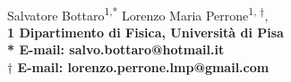 \documentclass[10pt,letterpaper]{article}
\date{15.03.16}
\begin{document}
\vspace*{0.30in}

\begin{flushleft}
{\Large
\textbf{}
}
\newline
\\
Salvatore Bottaro\textsuperscript{1,*}
Lorenzo Maria Perrone\textsuperscript{1, $\dagger$},
\\
\bf{1} Dipartimento di Fisica, Università di Pisa
\\

% 
%





* E-mail: salvo.bottaro@hotmail.it\\
$\dagger$ E-mail: lorenzo.perrone.lmp@gmail.com
\end{flushleft}
\end{document}
